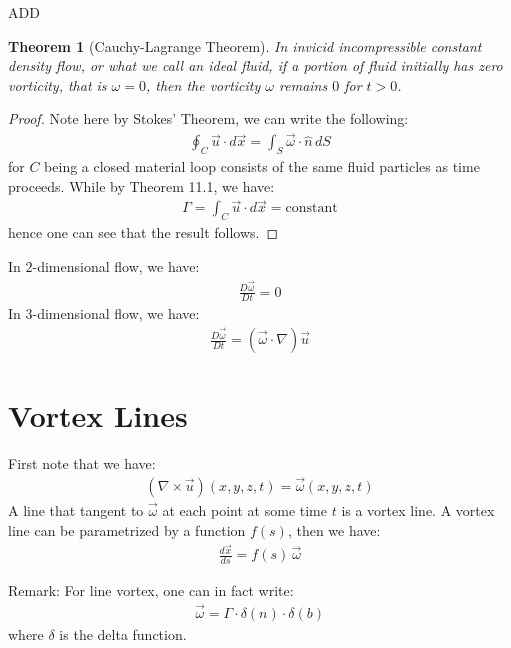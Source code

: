 \documentclass[11pt]{book}
\theoremstyle{break}
\theoremstyle{break}
\newtheorem{thm}{Theorem}[section]
\newcommand{\remark}{\color{blue}Remark: \color{black}}
\begin{document}
ADD
 
 
\begin{thm}[Cauchy-Lagrange Theorem]
In invicid incompressible constant density flow, or what we call an ideal fluid, if a portion of fluid initially has zero vorticity, that is $\omega = 0$, then the vorticity $\omega$ remains $0$ for $t>0$.
\end{thm}
\begin{proof}
Note here by Stokes' Theorem, we can write the following:
\begin{align*}
\oint_C \vec{u}\cdot d\vec{x} = \int_S \vec{\omega} \cdot \hat{n}\, dS
\end{align*}
for $C$ being a closed material loop consists of the same fluid particles as time proceeds. While by Theorem 11.1, we have:
\begin{align*}
\Gamma = \int_C \vec{u}\cdot d\vec{x} = \text{constant}
\end{align*}
hence one can see that the result follows. 
\end{proof}

In $2$-dimensional flow, we have:
\begin{align*}
\frac{D\vec{\omega}}{Dt} = 0 \tag{2-D}
\end{align*}
In $3$-dimensional flow, we have:
\begin{align*}
\frac{D\vec{\omega}}{Dt} = (\vec{\omega}\cdot \nabla) \vec{u} 
\end{align*}


\newpage
\section[Vortex Lines]{\color{red} Vortex Lines\color{black}}
First note that we have:
\begin{align*}
(\nabla \times \vec{u}) (x,y,z,t) = \vec{\omega}(x,y,z,t)
\end{align*}
A line that tangent to $\vec{\omega}$ at each point at some time $t$ is a vortex line. A vortex line can be parametrized by a function $f(s)$, then we have:
\begin{align*}
\frac{d\vec{x}}{ds} = f(s) \, \vec{\omega}
\end{align*}


\remark For line vortex, one can in fact write:
\begin{align*}
\vec{\omega} = \Gamma\cdot \delta(n)\cdot \delta(b)
\end{align*}
where $\delta$ is the delta function.\\
\end{document}
